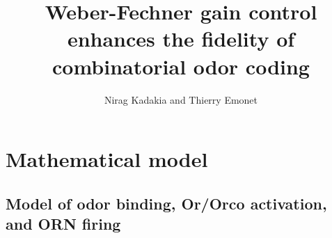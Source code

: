 \documentclass[9pt,twoside]{pnas-new}
\title{Weber-Fechner gain control enhances the fidelity of combinatorial odor coding}
\author{Nirag Kadakia and Thierry Emonet}
\begin{document}


\SItext

\section*{Mathematical model}

\subsection*{Model of odor binding, Or/Orco activation, and ORN firing}
\end{document}
